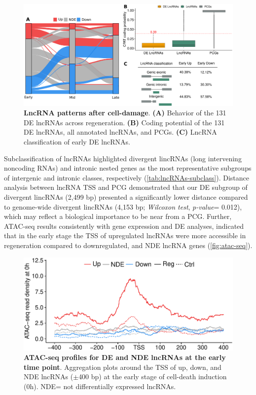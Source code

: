 \begin{figure}[ht!]
  \centering
  \includegraphics[scale=0.37]{plots/results/dme/chr.lncRNA.early.v2.pdf}
  \caption[LncRNA patterns after cell-damage]{\textbf{LncRNA patterns after cell-damage}. \textbf{(A)} Behavior of the 131 DE lncRNAs across regeneration. \textbf{(B)} Coding potential of the 131 DE lncRNAs, all annotated lncRNAs, and PCGs. \textbf{(C)} LncRNA classification of early DE lncRNAs. }
  \label{fig:chracterization-lncRNAs}
\end{figure}

Subclassification of lncRNAs highlighted divergent lincRNAs (long intervening noncoding RNAs) and intronic nested genes as the most representative subgroups of intergenic and intronic classes, respectively (\autoref{tab:lncRNAs-subclass}). Distance analysis between lncRNA TSS and PCG demonstrated that our DE subgroup of divergent lincRNAs (2,499 bp) presented a significantly lower distance compared to genome-wide divergent lincRNAs (4,153 bp; \textit{Wilcoxon test}, \textit{p-value}= 0.012), which may reflect a biological importance to be near from a PCG. Further, ATAC-seq results consistently with gene expression and DE analyses, indicated that in the early stage the TSS of upregulated lncRNAs were more accessible in regeneration compared to downregulated, and NDE lncRNA genes (\autoref{fig:atac-seq}). 

\begin{figure}[ht!]
  \centering
  \includegraphics[scale=0.7]{plots/results/dme/atac.seq.agg.early.pdf}
  \caption[ATAC-seq profiles for DE and NDE lncRNAs at the early time point]{\textbf{ATAC-seq profiles for DE and NDE lncRNAs at the early time point}. Aggregation plots around the TSS of up, down, and NDE lncRNAs ($\pm$400 bp) at the early stage of cell-death induction (0h). NDE= not differentially expressed lncRNAs.}
  \label{fig:atac-seq}
\end{figure}


